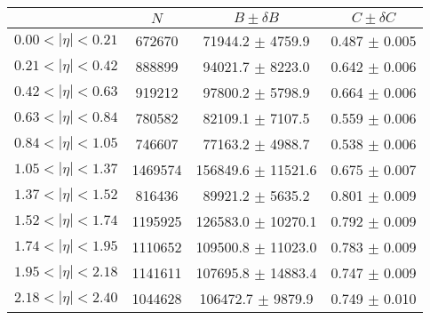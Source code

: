 \begin{tabular}{lccc}
\hline
    &   $N$   & $B \pm \delta B$  &  $C \pm \delta C$ \\
\hline
$0.00 < |\eta| <0.21$          & 672670     & 71944.2    $\pm$ 4759.9 & 0.487      $\pm$ 0.005 \\
$0.21 < |\eta| <0.42$          & 888899     & 94021.7    $\pm$ 8223.0 & 0.642      $\pm$ 0.006 \\
$0.42 < |\eta| <0.63$          & 919212     & 97800.2    $\pm$ 5798.9 & 0.664      $\pm$ 0.006 \\
$0.63 < |\eta| <0.84$          & 780582     & 82109.1    $\pm$ 7107.5 & 0.559      $\pm$ 0.006 \\
$0.84 < |\eta| <1.05$          & 746607     & 77163.2    $\pm$ 4988.7 & 0.538      $\pm$ 0.006 \\
$1.05 < |\eta| <1.37$          & 1469574    & 156849.6   $\pm$ 11521.6 & 0.675      $\pm$ 0.007 \\
$1.37 < |\eta| <1.52$          & 816436     & 89921.2    $\pm$ 5635.2 & 0.801      $\pm$ 0.009 \\
$1.52 < |\eta| <1.74$          & 1195925    & 126583.0   $\pm$ 10270.1 & 0.792      $\pm$ 0.009 \\
$1.74 < |\eta| <1.95$          & 1110652    & 109500.8   $\pm$ 11023.0 & 0.783      $\pm$ 0.009 \\
$1.95 < |\eta| <2.18$          & 1141611    & 107695.8   $\pm$ 14883.4 & 0.747      $\pm$ 0.009 \\
$2.18 < |\eta| <2.40$          & 1044628    & 106472.7   $\pm$ 9879.9 & 0.749      $\pm$ 0.010 \\
\hline
\end{tabular}
